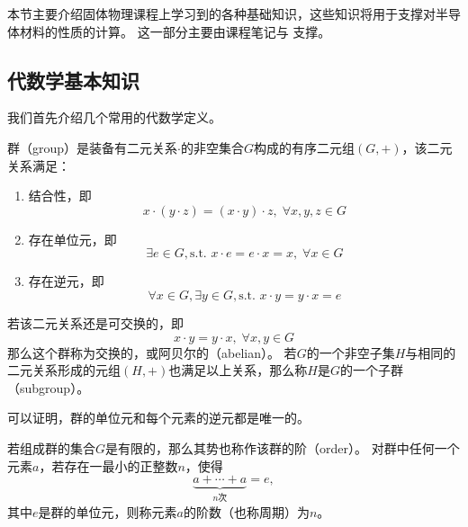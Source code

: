 
本节主要介绍固体物理课程上学习到的各种基础知识，这些知识将用于支撑对半导体材料的性质的计算。
这一部分主要由课程笔记与 \cite{solidphysics2014huang} 支撑。

\subsection{代数学基本知识}

我们首先介绍几个常用的代数学定义。

\begin{definition}
    群（group）是装备有二元关系$\cdot$的非空集合$G$构成的有序二元组$(G, +)$，该二元关系满足：
    \begin{enumerate}[nosep]
        \item 结合性，即
            \begin{equation}x\cdot ( y \cdot z) = (x \cdot y) \cdot z, \; \forall x,y,z \in G\end{equation}
        \item 存在单位元，即
            \begin{equation}\exists e \in G, \text{s.t. } x \cdot e = e\cdot x = x, \; \forall x \in G\end{equation}
        \item 存在逆元，即
            \begin{equation}\forall x \in G, \exists y \in G, \text{s.t. } x \cdot y = y \cdot x = e\end{equation}
    \end{enumerate}
    若该二元关系还是可交换的，即
    \begin{equation}x \cdot y = y \cdot x, \; \forall x, y \in G\end{equation}
    那么这个群称为交换的，或阿贝尔的（abelian）。
    若$G$的一个非空子集$H$与相同的二元关系形成的元组$(H,+)$也满足以上关系，那么称$H$是$G$的一个子群（subgroup）。
\end{definition}

可以证明，群的单位元和每个元素的逆元都是唯一的。

\begin{definition}
    若组成群的集合$G$是有限的，那么其势也称作该群的阶（order）。
    对群中任何一个元素$a$，若存在一最小的正整数$n$，使得
    \begin{equation}
        \underbrace{a+\cdots+a}_{n \text{次}} = e,
    \end{equation}
    其中$e$是群的单位元，则称元素$a$的阶数（也称周期）为$n$。
\end{definition}

